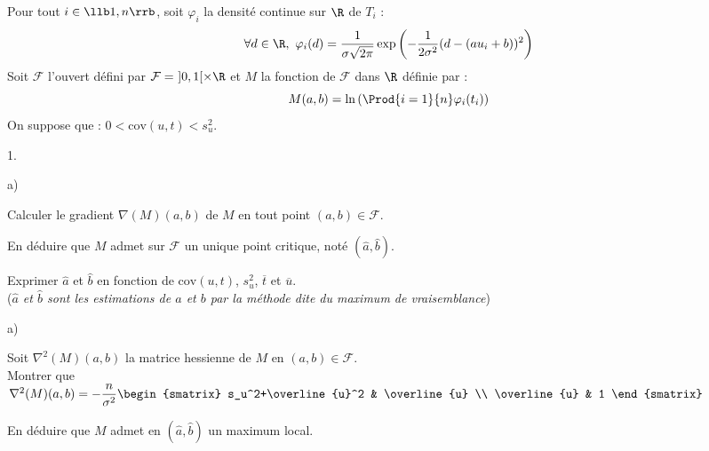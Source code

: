 \documentclass[11pt]{article}%
\begin{document}
\noindent
Pour tout $i \in \llb 1,n \rrb$, soit $\varphi_i$ la densité continue 
sur $\R$ de $T_i$ : 
\[
 \forall d \in \R, \ 
 \varphi_i(d)=\dfrac{1}{\sigma\sqrt{2\pi}}\exp\left(-\dfrac{1}{2\sigma^2
 } (d-(au_i+b))^2\right)
\]
Soit $\mathcal{F}$ l'ouvert défini par $\mathcal{F}= \ ]0,1[ \times \R$ 
et 
$M$ la fonction de $\mathcal{F}$ dans $\R$ définie par :
\[
 M(a,b)=\ln\left(\Prod{i=1}{n} \varphi_i(t_i)\right)
\]
On suppose que : $0 < \mathrm{cov}(u,t) < s_u^2$.

\begin{noliste}{1.}
 \setlength{\itemsep}{4mm}
 \setcounter{enumi}{9}
 \item 
 \begin{noliste}{a)}
  \setlength{\itemsep}{2mm}
  \item Calculer le gradient $\nabla(M)(a,b)$ de $M$ en tout point 
  $(a,b) \in \mathcal{F}$.
  
  
  
  
  
  

  
  \item En déduire que $M$ admet sur $\mathcal{F}$ un unique point 
  critique, noté $(\hat{a},\hat{b})$.
  
  
  
  \item Exprimer $\hat{a}$ et $\hat{b}$ en fonction de 
  $\mathrm{cov}(u,t)$, $s_u^2$, $\overline{t}$ et $\overline{u}$.\\
  ({\it $\hat{a}$ et $\hat{b}$ sont les estimations de $a$ et $b$ par 
  la méthode dite du maximum de vraisemblance})
  
  

 \end{noliste}
 
 \item 
 \begin{noliste}{a)}
  \setlength{\itemsep}{2mm}
  \item Soit $\nabla^2(M)(a,b)$ la matrice hessienne de $M$ en $(a,b) 
  \in \mathcal{F}$. \\
  Montrer que $\nabla^2(M)(a,b) = -\dfrac{n}{\sigma^2}
  \begin{smatrix}
   s_u^2+\overline{u}^2 & \overline{u} \\
   \overline{u} & 1
  \end{smatrix}$
  
  
    
  \item En déduire que $M$ admet en $(\hat{a},\hat{b})$ un maximum 
  local.
  

\end{noliste}
\end{noliste}
\end{document}
